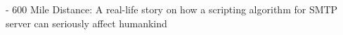 - 600 Mile Distance: A real-life story on how a scripting algorithm for SMTP server can seriously affect humankind \\
